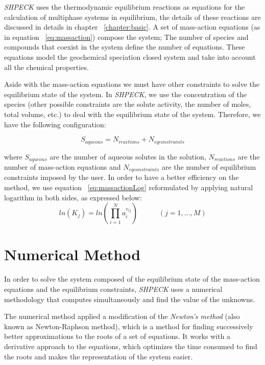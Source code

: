 \emph{SHPECK} uses the thermodynamic equilibrium reactions as equations for the calculation of multiphase systems in equilibrium, the details of these reactions are discussed in details in chapter ~\ref{chapter:basic}. A set of mass-action equations (as in equation ~\ref{eq:massaction}) compose the system; The number of species and compounds that coexist in the system define the number of equations. These equations model the geochemical speciation closed system and take into account all the chemical properties.

Aside with the mass-action equations we must have other constraints to solve the equilibrium state of the system. In \emph{SHPECK}, we use the concentration of the species (other possible constraints are the solute activity, the number of moles, total volume, etc.) to deal with the equilibrium state of the system. Therefore, we have the following configuration:

\begin{equation}\label{eq:configuration}
S_{aqueous} = N_{reactions} + N_{eq constraints}
\end{equation}

where $S_{aqueous}$ are the number of aqueous solutes in the solution, $N_{reactions}$ are the number of mass-action equations and $N_{eq constraints}$ are the number of equilibrium constraints imposed by the user. 
In order to have a better efficiency on the method, we use equation ~\ref{eq:massactionLog} reformulated by applying natural logarithm in both sides, as expressed below:
\begin{equation}\label{eq:massactionLog}
ln({K_j}) =  ln({\prod\limits_{i=1}^N  a_i^{v_{ij}}}) \hspace{35pt}    (j = 1, ... , M)
\end{equation}

\section{Numerical Method}
In order to solve the system composed of the equilibrium state of the mass-action equations and the equilibrium constraints, \emph{SHPECK} uses a numerical methodology that computes simultaneously and find the value of the unknowns.


The numerical method applied a modification of the \emph{Newton's method} (also known as Newton-Raphson method), which is a method for finding successively better approximations to the roots of a set of equations. It works with a derivative approach to the equations, which optimizes the time consumed to find the roots and makes the representation of the system easier.

